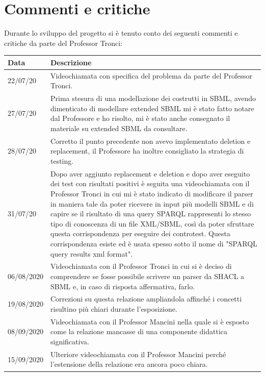 \documentclass{article}
\begin{document}
\clearpage
\section{Commenti e critiche}
Durante lo sviluppo del progetto si è tenuto conto dei seguenti commenti e critiche da parte del Professor Tronci:

\begin{longtable}{p{2cm}p{9cm}}
    \textbf{Data} & \textbf{Descrizione} \\
    \hline
    22/07/20 & Videochiamata con specifica del problema da parte del Professor Tronci. \\
    \hline
    27/07/20 & Prima stesura di una modellazione dei costrutti in SBML, avendo dimenticato di modellare extended SBML mi è stato fatto notare dal Professore e ho risolto, mi è stato anche consegnato il materiale su extended SBML da consultare. \\
    \hline
    28/07/20 & Corretto il punto precedente non avevo implementato deletion e replacement, il Professore ha inoltre consigliato la strategia di testing. \\
    \hline
    31/07/20 & Dopo aver aggiunto replacement e deletion e dopo aver eseguito dei test con risultati positivi è seguita una videochiamata con il Professor Tronci in cui mi è stato indicato di modificare il parser in maniera tale da poter ricevere in input più modelli SBML e di capire se il risultato di una query SPARQL rappresenti lo stesso tipo di conoscenza di un file XML/SBML, così da poter sfruttare questa corrispondenza per eseguire dei controtest. Questa corrispondenza esiste ed è usata spesso sotto il nome di "SPARQL query results xml format". \\
    \hline
    06/08/2020 & Videochiamata con il Professor Tronci in cui si è deciso di comprendere se fosse possibile scrivere un parser da SHACL a SBML e, in caso di risposta affermativa, farlo. \\
    \hline
    19/08/2020 & Correzioni su questa relazione ampliandola affinché i concetti risultino più chiari durante l'esposizione. \\
    \hline
    08/09/2020 & Videochiamata con il Professor Mancini nella quale si è esposto come la relazione mancasse di una componente didattica significativa. \\
    \hline
    15/09/2020 & Ulteriore videochiamata con il Professor Mancini perché l'estensione della relazione era ancora poco chiara. \\
    \hline
\end{longtable}
\end{document}
